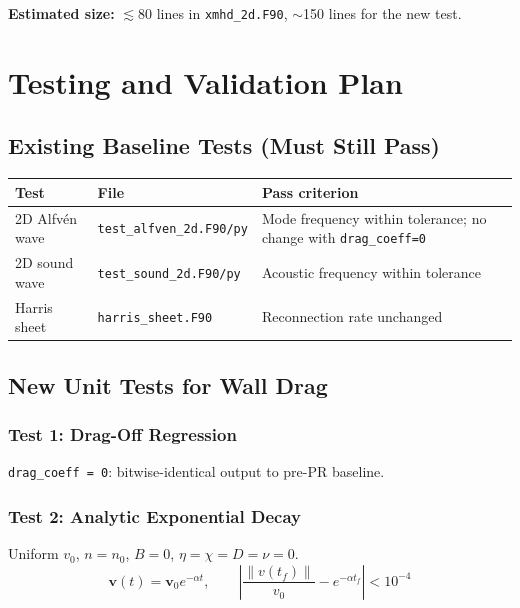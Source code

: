 \documentclass[11pt,letterpaper]{article}
\begin{document}
\textbf{Estimated size:} $\lesssim$80 lines in \texttt{xmhd\_2d.F90}, $\sim$150 lines
for the new test.

\section{Testing and Validation Plan}

\subsection{Existing Baseline Tests (Must Still Pass)}

\begin{center}
\begin{longtable}{p{}p{}p{}}
\toprule
\textbf{Test} & \textbf{File} & \textbf{Pass criterion} \\
\midrule
2D Alfv\'{e}n wave & \texttt{test\_alfven\_2d.F90/py} & Mode frequency within tolerance; no change with \texttt{drag\_coeff=0} \\
2D sound wave & \texttt{test\_sound\_2d.F90/py} & Acoustic frequency within tolerance \\
Harris sheet & \texttt{harris\_sheet.F90} & Reconnection rate unchanged \\
\bottomrule
\end{longtable}
\end{center}

\subsection{New Unit Tests for Wall Drag}

\subsubsection{Test 1: Drag-Off Regression}
\texttt{drag\_coeff = 0}: bitwise-identical output to pre-PR baseline.

\subsubsection{Test 2: Analytic Exponential Decay}
Uniform $v_0$, $n = n_0$, $B = 0$, $\eta = \chi = D = \nu = 0$.
\begin{equation}
  \mathbf{v}(t) = \mathbf{v}_0 e^{-\alpha t}, \qquad
  \left|\frac{\|v(t_f)\|}{v_0} - e^{-\alpha t_f}\right| < 10^{-4}
\end{equation}
\end{document}

